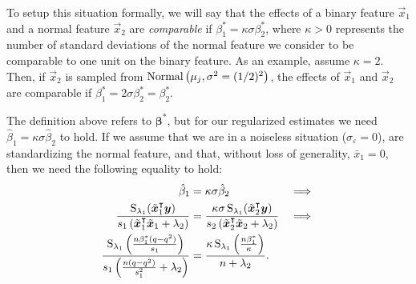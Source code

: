 To setup this situation formally, we will say that the effects of a binary feature
\(\vec{x}_1\) and a normal feature \(\vec{x}_2\) are \emph{comparable} if \(\beta^*_1 =
\kappa \sigma \beta^*_2\), where \(\kappa > 0\) represents the number of standard
deviations of the normal feature we consider to be comparable to one unit on the binary
feature. As an example, assume \(\kappa = 2\). Then, if \(\vec{x}_2\) is sampled from
\(\operatorname{Normal}\left(\mu_j, \sigma^2 = (1/2)^2\right)\), the effects of \(\vec{x}_1\) and
\(\vec{x}_2\) are comparable if \(\beta_1^* = 2\sigma \beta_2^* = \beta_2^*\).


The definition above refers to \(\bm{\beta}^*\), but for our regularized estimates we need
\(\hat{\beta}_1 = \kappa\sigma\hat{\beta}_2\) to hold. If we assume that we are in a
noiseless situation (\(\sigma_\varepsilon = 0\)), are standardizing the normal feature, and
that, without loss of generality, \(\bar{x}_1 = 0\), then we need the following equality to
hold:
%
\begin{align}
  \label{eq:comparable-effects}
  \hat{\beta}_1                                                                                                                          & = \kappa\sigma \hat{\beta}_2                                                                                                                         & \implies \nonumber \\
  \frac{\operatorname{S}_{\lambda_1}(\tilde{\boldsymbol{x}}_1^\intercal \boldsymbol{y})}{s_1\left(\tilde{\boldsymbol{x}}_1^\intercal \tilde{\boldsymbol{x}}_1 + \lambda_2\right)} & =\frac{\kappa\sigma \operatorname{S}_{\lambda_1}(\tilde{\boldsymbol{x}}_2^\intercal \boldsymbol{y})}{s_2\left(\tilde{\boldsymbol{x}}_2^\intercal \tilde{\boldsymbol{x}}_2 + \lambda_2\right)} & \implies \nonumber \\
  \frac{\operatorname{S}_{\lambda_1}\left(\frac{n\beta_1^* (q - q^2)}{s_1}\right)}{s_1\left(\frac{n(q - q^2)}{s_1^2} + \lambda_2\right)}              & =  \frac{\kappa \operatorname{S}_{\lambda_1}\left(\frac{n\beta_1^*}{\kappa} \right)}{n + \lambda_2}.                                                              &
\end{align}


